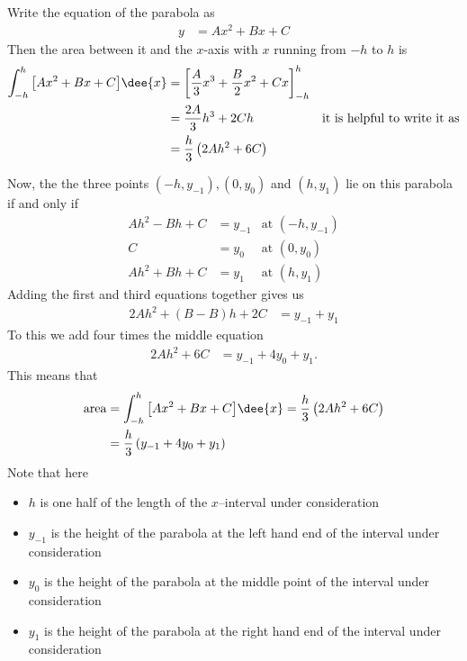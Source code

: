 Write the equation of the parabola as
\begin{align*}
  y &= Ax^2 + Bx +C
\end{align*}
Then the area between it and the $x$-axis with $x$ running from $-h$ to $h$ is
\begin{align*}
  \int_{-h}^h \big[ Ax^2 + Bx +C \big] \dee{x}
  &= \left[ \frac{A}{3}x^3 + \frac{B}{2}x^2 + Cx \right]_{-h}^h \\
  &= \frac{2A}{3}h^3 + 2Ch & \text{it is helpful to write it as}\\
  &= \frac{h}{3}\left( 2Ah^2 + 6C \right)
\end{align*}

Now, the the three points $(-h,y_{-1}), (0,y_0)$ and $(h,y_1)$ lie on this parabola if and
only if
\begin{align*}
A h^2 - Bh + C &= y_{-1} & \text{at $(-h,y_{-1})$} \\
C &= y_{0} & \text{at $(0,y_{0})$} \\
A h^2 + Bh + C &= y_{1} & \text{at $(h,y_{1})$}
\end{align*}
Adding the first and third equations together gives us
\begin{align*}
  2Ah^2 + (B-B)h + 2C &= y_{-1}+y_{1}
\end{align*}
To this we add four times the middle equation
\begin{align*}
  2Ah^2 + 6C &= y_{-1}+4y_0+y_1.
\end{align*}
This means that
\begin{align*}
  \text{area} &=  \int_{-h}^h \big[ Ax^2 + Bx +C \big] \dee{x}
  = \frac{h}{3}\left( 2Ah^2 + 6C \right)\\
  &= \frac{h}{3}\left(y_{-1}+4y_0+y_1\right)
\end{align*}
Note that here
\begin{itemize}
\item $h$ is one half of the length of the $x$--interval under consideration
\item $y_{-1}$ is the height of the parabola at the left hand end of the interval under
consideration
\item $y_0$ is the height of the parabola at the middle point of the interval under
consideration
\item $y_{1}$ is the height of the parabola at the right hand end of the interval under
consideration
\end{itemize}


